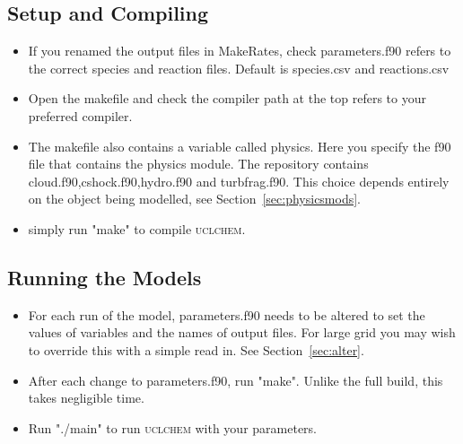 \documentclass{llncs}
\begin{document}
\subsection{Setup and Compiling}
\begin{itemize}
\item If you renamed the output files in MakeRates, check parameters.f90 refers to the correct species and reaction files. Default is species.csv and reactions.csv
\item Open the makefile and check the compiler path at the top refers to your preferred compiler.
\item The makefile also contains a variable called physics. Here you specify the f90 file that contains the physics module. The repository contains cloud.f90,cshock.f90,hydro.f90 and turbfrag.f90. This choice depends entirely on the object being modelled, see Section~\ref{sec:physicsmods}.
\item simply run "make" to compile \textsc{uclchem}.
\end{itemize}
%
\subsection{Running the Models}
\begin{itemize}
\item For each run of the model, parameters.f90 needs to be altered to set the values of variables and the names of output files. For large grid you may wish to override this with a simple read in. See Section~\ref{sec:alter}.
\item After each change to parameters.f90, run "make". Unlike the full build, this takes negligible time.
\item Run "./main" to run \textsc{uclchem} with your parameters.
\end{itemize}
%
%
\end{document}
